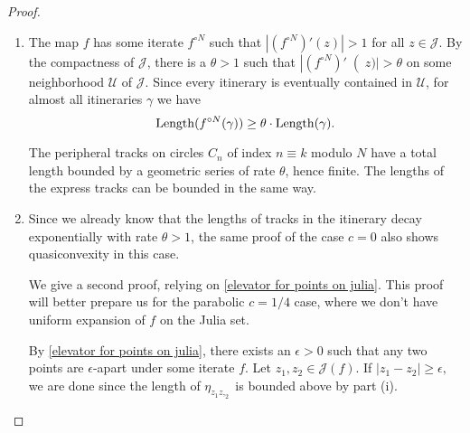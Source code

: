 \begin{proof} \leavevmode
\begin{enumerate}[label=\normalfont(\roman*)]
\item The map $f$ has some iterate $f^{\circ N}$ such that $|(f^{\circ N})'(z)|>1$ for all $z \in \mathcal{J}$.
By the compactness of $\mathcal J$, there is a $\theta >1$ such that $\left|(f^{\circ N})'\right (z)|>\theta$ on some neighborhood $\mathcal{U}$ of $\mathcal{J}$.
Since every itinerary is eventually contained in $\mathcal{U}$, for almost all itineraries $\gamma$ we have 
\begin{equation*}
\operatorname{Length} ( f^{\circ N}(\gamma) ) \geq \theta \cdot \operatorname{Length}( \gamma). 
\end{equation*}

The peripheral tracks on circles $C_n$ of index $n \equiv k$ modulo $N$ have a total length bounded by a geometric series of rate $\theta$, hence finite. 
The lengths of the express tracks can be bounded in the same way. %

\item Since we already know that the lengths of tracks in the itinerary decay exponentially with rate $\theta>1$, the same proof of the case $c=0$ also shows quasiconvexity in this case.

We give a second proof, relying on \cref{elevator for points on julia}. This proof will better prepare us for the parabolic $c=1/4$ case, where we don't have uniform expansion of $f$ on the Julia set.

By \cref{elevator for points on julia}, there exists an $\epsilon>0$ such that any two points are $\epsilon$-apart under some iterate $f$. 
Let $z_{1},z_{2}\in\mathcal{J}(f)$. If $\left|z_{1}-z_{2}\right|\geq\epsilon,$ we are done since the length of $\eta_{z_1z,_2}$ is bounded above by part (i).

\begin{comment}
Explicitly, if $\Length\left(\eta_{z}\right)\leq L$
for all $z\in\mathcal{J}$ then we take $A\geq\frac{2L}{\epsilon}$
and then automatically $\Length\left(\eta_{z_{1}}+\eta_{z_{2}}\right)\leq A\left|z_{1}-z_{2}\right|$.
\end{comment}


\end{enumerate}
\end{proof}
